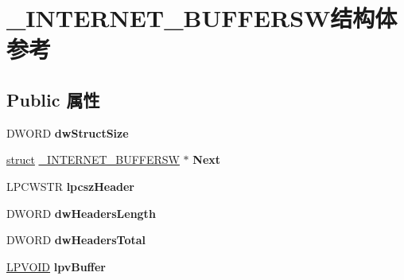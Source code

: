 \hypertarget{struct___i_n_t_e_r_n_e_t___b_u_f_f_e_r_s_w}{}\section{\+\_\+\+I\+N\+T\+E\+R\+N\+E\+T\+\_\+\+B\+U\+F\+F\+E\+R\+S\+W结构体 参考}
\label{struct___i_n_t_e_r_n_e_t___b_u_f_f_e_r_s_w}
\subsection*{Public 属性}
\begin{DoxyCompactItemize}
\item 
\mbox{\label{struct___i_n_t_e_r_n_e_t___b_u_f_f_e_r_s_w_af1f9232922dd39f58f43617918dd47dc}} 
D\+W\+O\+RD {\bfseries dw\+Struct\+Size}
\item 
\mbox{\label{struct___i_n_t_e_r_n_e_t___b_u_f_f_e_r_s_w_aa67705ab24006071efa81acd9522848d}} 
\hyperlink{interfacestruct}{struct} \hyperlink{struct___i_n_t_e_r_n_e_t___b_u_f_f_e_r_s_w}{\+\_\+\+I\+N\+T\+E\+R\+N\+E\+T\+\_\+\+B\+U\+F\+F\+E\+R\+SW} $\ast$ {\bfseries Next}
\item 
\mbox{\label{struct___i_n_t_e_r_n_e_t___b_u_f_f_e_r_s_w_ad07e68158e99cd95a13b3e02469f0134}} 
L\+P\+C\+W\+S\+TR {\bfseries lpcsz\+Header}
\item 
\mbox{\label{struct___i_n_t_e_r_n_e_t___b_u_f_f_e_r_s_w_ade5b5a062e6e38e10e725bf1f022db16}} 
D\+W\+O\+RD {\bfseries dw\+Headers\+Length}
\item 
\mbox{\label{struct___i_n_t_e_r_n_e_t___b_u_f_f_e_r_s_w_a1debea3c57e1c3aba7f882aece62b6d8}} 
D\+W\+O\+RD {\bfseries dw\+Headers\+Total}
\item 
\mbox{\label{struct___i_n_t_e_r_n_e_t___b_u_f_f_e_r_s_w_aeb67a48c1eed6eeb4a5897bff014a9d1}} 
\hyperlink{interfacevoid}{L\+P\+V\+O\+ID} {\bfseries lpv\+Buffer}
\item 
\mbox{\label{struct___i_n_t_e_r_n_e_t___b_u_f_f_e_r_s_w_a386d4952a85cbb1f91ae8a48c4d791c2}} 

\end{DoxyCompactItemize}
